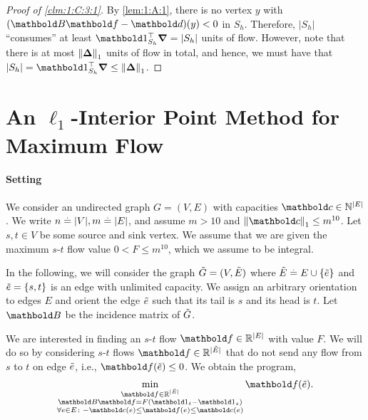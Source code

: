 \documentclass{tufte-handout}
\newcommand{\Etil}{\Tilde{E}}
\newcommand{\etil}{\Tilde{e}}
\begin{document}
\begin{proof}[Proof of \cref{clm:1:C:3:1}]
By \cref{lem:1:A:1}, there is no vertex $y$ with $(\mB\vf - \vd)(y) < 0$ in $S_h$. Therefore, $|S_h|$ ``consumes'' at least $\trans{\vOne}_{S_h}\vnabla = |S_h|$ units of flow. However, note that there is at most $\norm{\vDelta}_1$ units of flow in total, and hence, we must have that $|S_h| = \trans{\vOne}_{S_h}\vnabla \leq \norm{\vDelta}_1$.
\end{proof}

\section{An $\ell_1$-Interior Point Method for Maximum Flow}

\paragraph{Setting} We consider an undirected graph $G = (V,E)$ with capacities $\vc \in \Nat^{|E|}$. We write $n \overset{.}{=} |V|, m \overset{.}{=} |E|$, and assume $m > 10$ and $\norm{\vc}_1 \leq m^{10}$. Let $s, t \in V$ be some source and sink vertex. We assume that we are given the maximum $s$-$t$ flow value $0 < F \leq m^{10}$, which we assume to be integral.

In the following, we will consider the graph $\Tilde{G} = (V, \Etil)$ where $\Etil \defeq E \cup \{\etil\}$ and $\etil = \{s,t\}$ is an edge with unlimited capacity. We assign an arbitrary orientation to edges $E$ and orient the edge $\etil$ such that its tail is $s$ and its head is $t$. Let $\mB$ be the incidence matrix of $\Tilde{G}$.

We are interested in finding an $s$-$t$ flow $\vf \in \R^{|E|}$ with value $F$. We will do so by considering $s$-$t$ flows $\vf \in \R^{|\Etil|}$ that do not send any flow from $s$ to $t$ on edge $\etil$, i.e., $\vf(\etil) \leq 0$. We obtain the program, \begin{align}
    \min_{\substack{\vf \in \R^{|\Etil|} \\ \mB\vf = F(\vOne_t - \vOne_s) \\ \forall e \in E \colon -\vc(e) \leq \vf(e) \leq \vc(e)}} \vf(\etil). \label{eq:2:program}
\end{align}
\end{document}
